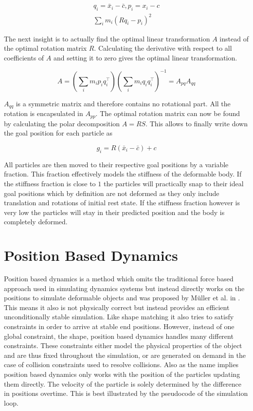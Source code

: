 \begin{gather}
q_i = \bar{x}_i - \bar{c}, p_i = x_i - c \\
\sum\limits_i m_i(Rq_i-p_i)^2
\label{eq:center_of_mass_shape_matching}
\end{gather}

The next insight is to actually find the optimal linear transformation \(A\) instead of the optimal rotation matrix \(R\).  Calculating the derivative with respect to all coefficients of \(A\) and setting it to zero gives the optimal linear transformation.

\begin{equation}
A = (\sum_i m_i p_i q_i^\top)(\sum_i m_i q_i q_i^\top)^{-1}=A_{pq}A_{qq}
\end{equation}

\(A_{qq}\) is a symmetric matrix and therefore contains no rotational part. All the rotation is encapsulated in \(A_{pp}\). The optimal rotation matrix can now be found by calculating the polar decomposition \(A = RS\). This allows to finally write down the goal position for each particle as

\begin{equation}
g_i = R(\bar{x}_i - \bar{c}) + c
\end{equation}

All particles are then moved to their respective goal positions by a variable fraction. This fraction effectively models the stiffness of the deformable body. If the stiffness fraction is close to $1$ the particles will practically snap to their ideal goal positions which by definition are not deformed as they only include translation and rotations of initial rest state. If the stiffness fraction however is very low the particles will stay in their predicted position and the body is completely deformed.

\section{Position Based Dynamics}
\label{sec:position_based_dynamics}

Position based dynamics is a method which omits the traditional force based approach used in simulating dynamics systems but instead directly works on the positions to simulate deformable objects and was proposed by M{\"u}ller et al. in \cite{Muller:2007vs}. This means it also is not physically correct but instead provides an efficient unconditionally stable simulation. Like shape matching it also tries to satisfy constraints in order to arrive at stable end positions. However, instead of one global constraint, the shape, position based dynamics handles many different constraints. These constraints either model the physical properties of the object and are thus fixed throughout the simulation, or are generated on demand in the case of collision constraints used to resolve collisions. Also as the name implies position based dynamics only works with the position of the particles updating them directly. The velocity of the particle is solely determined by the difference in positions overtime. This is best illustrated by the pseudocode of the simulation loop.

